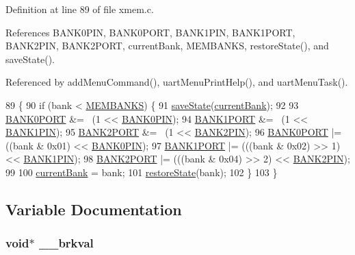Definition at line 89 of file xmem.\-c.



References B\-A\-N\-K0\-P\-I\-N, B\-A\-N\-K0\-P\-O\-R\-T, B\-A\-N\-K1\-P\-I\-N, B\-A\-N\-K1\-P\-O\-R\-T, B\-A\-N\-K2\-P\-I\-N, B\-A\-N\-K2\-P\-O\-R\-T, current\-Bank, M\-E\-M\-B\-A\-N\-K\-S, restore\-State(), and save\-State().



Referenced by add\-Menu\-Command(), uart\-Menu\-Print\-Help(), and uart\-Menu\-Task().


\begin{DoxyCode}
89                                \{
90     \textcolor{keywordflow}{if} (bank < \hyperlink{group__xmem_ga1ed280cb3dd0a4a03aeda6aaccc180d3}{MEMBANKS}) \{
91         \hyperlink{group__xmem_ga1b5d7ce361c908dce9af0faf79987124}{saveState}(\hyperlink{group__xmem_ga4a1acf2db179d35f089bd00881d1c2eb}{currentBank});
92 
93         \hyperlink{group__config_gabeec1986c81588dde8863b7936028fc9}{BANK0PORT} &= ~(1 << \hyperlink{group__config_gaa176e9b2752f764cd7e7d9fd49d46af8}{BANK0PIN});
94         \hyperlink{group__config_ga8b3ee7126196f6e939989eae097c3ac4}{BANK1PORT} &= ~(1 << \hyperlink{group__config_gacfebedc2067e3c52e6ae1f627afcc1e1}{BANK1PIN});
95         \hyperlink{group__config_gad35afb0251524c201c2d60f3d035af32}{BANK2PORT} &= ~(1 << \hyperlink{group__config_ga74c95f6ccdb5e482e97a5af53ed74229}{BANK2PIN});
96         \hyperlink{group__config_gabeec1986c81588dde8863b7936028fc9}{BANK0PORT} |= ((bank & 0x01) << \hyperlink{group__config_gaa176e9b2752f764cd7e7d9fd49d46af8}{BANK0PIN});
97         \hyperlink{group__config_ga8b3ee7126196f6e939989eae097c3ac4}{BANK1PORT} |= (((bank & 0x02) >> 1) << \hyperlink{group__config_gacfebedc2067e3c52e6ae1f627afcc1e1}{BANK1PIN});
98         \hyperlink{group__config_gad35afb0251524c201c2d60f3d035af32}{BANK2PORT} |= (((bank & 0x04) >> 2) << \hyperlink{group__config_ga74c95f6ccdb5e482e97a5af53ed74229}{BANK2PIN});
99 
100         \hyperlink{group__xmem_ga4a1acf2db179d35f089bd00881d1c2eb}{currentBank} = bank;
101         \hyperlink{group__xmem_ga02e35ec14c8649b89dd91b5155031e2f}{restoreState}(bank);
102     \}
103 \}
\end{DoxyCode}


\subsection{Variable Documentation}
\hypertarget{group__xmem_ga8d18204366e8a385c441663ed41f1ae4}{
\subsubsection[{\-\_\-\-\_\-brkval}]{\setlength{\rightskip}{0pt plus 5cm}void$\ast$ \-\_\-\-\_\-brkval}}\label{group__xmem_ga8d18204366e8a385c441663ed41f1ae4}



